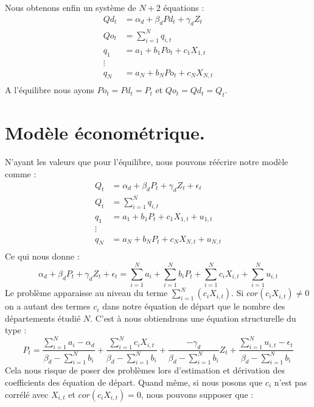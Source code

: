 \documentclass[11pt, a4paper]{article}
\begin{document}
Nous obtenons enfin un système de $N + 2$ équations : 
\begin{align*}
    Qd_t & = \alpha_d + \beta_d Pd_t + \gamma_d Z_t \\
    Qo_t & = \sum_{i = 1}^{N} q_{i,t} \\
    q_1 & = a_1 + b_1 Po_{t} + c_1 X_{1,t} \\ 
    \vdots \\ 
    q_N & = a_N + b_N Po_{t} + c_N X_{N,t} \\
\end{align*}
A l'équilibre nous ayons $Po_t = Pd_t = P_t$ et $Qo_t = Qd_t = Q_t$.

\section*{Modèle économétrique.}
N'ayant les valeurs que pour l'équilibre, nous pouvons réécrire notre modèle comme :
\begin{align*}
  Q_t & = \alpha_d + \beta_d P_t + \gamma_d Z_t + \epsilon_t \\
  Q_t & = \sum_{i = 1}^{N} q_{i,t} \\
  q_1 & = a_1 + b_1 P_{t} + c_1 X_{1,t} + u_{1,t}\\ 
  \vdots \\ 
  q_N & = a_N + b_N P_{t} + c_N X_{N,t} + u_{N,t}\\
\end{align*}
Ce qui nous donne : 
\begin{equation}
    \alpha_d + \beta_d P_t + \gamma_d Z_t + \epsilon_t = 
        \sum_{i = 1}^{N} a_i + \sum_{i = 1}^{N} b_i P_t + \sum_{i = 1}^{N} c_i X_{i,t} + \sum_{i = 1}^{N} u_{i,t}
\end{equation}
Le problème apparaisse au niveau du terme $\sum_{i = 1}^{N} (c_i X_{i,t})$. Si $cor(c_i X_{i,t}) \neq 0$ on a autant des termes $c_i$ dans notre équation de départ que le nombre des départements étudié $N$. 
C'est à nous obtiendrons une équation structurelle du type :
\begin{equation}
    P_t = \frac{\sum_{i = 1}^{N} a_i - \alpha_d}{\beta_d - \sum_{i = 1}^{N} b_i} + 
        \frac{\sum_{i = 1}^{N} c_i  X_{i,t}}{\beta_d - \sum_{i = 1}^{N} b_i} +
        \frac{-\gamma_d}{\beta_d - \sum_{i = 1}^{N} b_i} Z_t + 
        \frac{\sum_{i = 1}^{N} u_{i,t} - \epsilon_t}{\beta_d - \sum_{i = 1}^{N} b_i}
\end{equation}
Cela nous risque de poser des problèmes lors d'estimation et dérivation des coefficients des équation de départ.
Quand même, si nous posons que $c_i$ n'est pas corrélé avec $X_{i,t}$ et $cor(c_i X_{i,t}) = 0$, nous pouvons supposer que :
\end{document}
